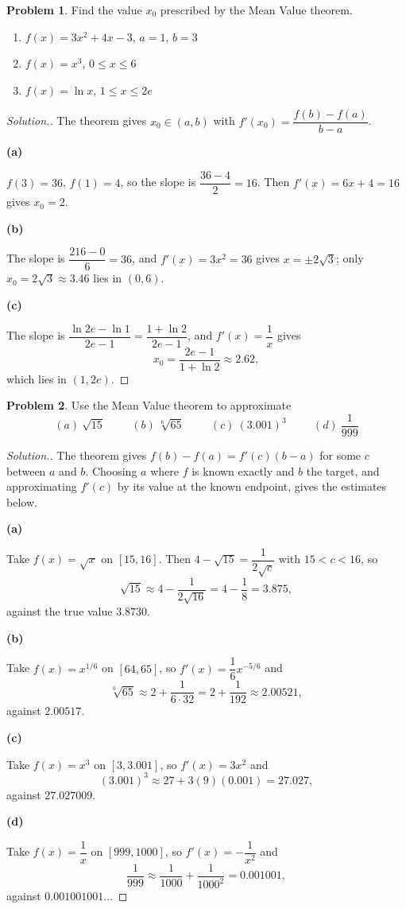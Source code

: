 \documentclass[11pt,a4paper]{article}
\theoremstyle{definition}
\newtheorem{problemx}{Problem}[subsection]
\newenvironment{problem}{\begin{problemx}}{\end{problemx}}
\newenvironment{solution}
  {\renewcommand{\qedsymbol}{}\begin{proof}[\textit{Solution}.]}
  {\end{proof}}
\newcommand{\subhead}[1]{%
  \par\medskip\noindent\textbf{#1}\par\nobreak\smallskip}
\begin{document}
\begin{problem}
Find the value $x_0$ prescribed by the Mean Value theorem.
\begin{enumerate}
\item[(a)] $f(x) = 3x^2+4x-3$, $a=1$, $b=3$
\item[(b)] $f(x) = x^3$, $0\leq x\leq 6$
\item[(c)] $f(x) = \ln x$, $1\leq x\leq 2e$
\end{enumerate}
\end{problem}
\begin{solution}
The theorem gives $x_0\in(a,b)$ with
$f'(x_0) = \dfrac{f(b)-f(a)}{b-a}$.

\subhead{(a)}
$f(3) = 36$, $f(1) = 4$, so the slope is $\dfrac{36-4}{2} = 16$. Then
$f'(x) = 6x+4 = 16$ gives $x_0 = 2$.

\subhead{(b)}
The slope is $\dfrac{216-0}{6} = 36$, and $f'(x) = 3x^2 = 36$ gives
$x = \pm 2\sqrt3$; only $x_0 = 2\sqrt3 \approx 3.46$ lies in $(0,6)$.

\subhead{(c)}
The slope is $\dfrac{\ln 2e - \ln 1}{2e-1} = \dfrac{1+\ln 2}{2e-1}$, and
$f'(x) = \dfrac1x$ gives
$$x_0 = \frac{2e-1}{1+\ln 2} \approx 2.62 ,$$
which lies in $(1, 2e)$.
\end{solution}

\begin{problem}
Use the Mean Value theorem to approximate
$$(a)\ \sqrt{15}\hspace{1cm} (b)\ \sqrt[6]{65}\hspace{1cm}
(c)\ (3.001)^3\hspace{1cm} (d)\ \frac{1}{999}$$
\end{problem}
\begin{solution}
The theorem gives $f(b) - f(a) = f'(c)(b-a)$ for some $c$ between $a$ and $b$.
Choosing $a$ where $f$ is known exactly and $b$ the target, and approximating
$f'(c)$ by its value at the known endpoint, gives the estimates below.

\subhead{(a)}
Take $f(x) = \sqrt x$ on $[15,16]$. Then
$4 - \sqrt{15} = \dfrac{1}{2\sqrt c}$ with $15<c<16$, so
$$\sqrt{15} \approx 4 - \frac{1}{2\sqrt{16}} = 4 - \frac18 = 3.875 ,$$
against the true value $3.8730$.

\subhead{(b)}
Take $f(x) = x^{1/6}$ on $[64,65]$, so $f'(x) = \dfrac{1}{6}x^{-5/6}$ and
$$\sqrt[6]{65} \approx 2 + \frac{1}{6\cdot 32} = 2 + \frac{1}{192}
\approx 2.00521 ,$$
against $2.00517$.

\subhead{(c)}
Take $f(x) = x^3$ on $[3, 3.001]$, so $f'(x) = 3x^2$ and
$$(3.001)^3 \approx 27 + 3(9)(0.001) = 27.027 ,$$
against $27.027009$.

\subhead{(d)}
Take $f(x) = \dfrac1x$ on $[999,1000]$, so $f'(x) = -\dfrac{1}{x^2}$ and
$$\frac{1}{999} \approx \frac{1}{1000} + \frac{1}{1000^2} = 0.001001 ,$$
against $0.001001001\ldots$
\end{solution}
\end{document}
